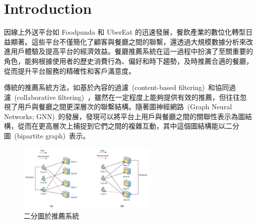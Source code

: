 \section{Introduction}
\label{sec:intro}

因線上外送平台如 Foodpanda 和 UberEat 的迅速發展，餐飲產業的數位化轉型日益顯著。這些平台不僅簡化了顧客與餐廳之間的聯繫，還透過大規模數據分析來改進用戶體驗及提高平台的經濟效益。餐廳推薦系統在這一過程中扮演了至關重要的角色，能夠根據使用者的歷史消費行為、偏好和時下趨勢，及時推薦合適的餐廳，從而提升平台服務的精確性和客戶滿意度。

傳統的推薦系統方法，如基於內容的過濾~(content-based filtering)~和協同過濾~(collaborative filtering)~，雖然在一定程度上能夠提供有效的推薦，但往往忽視了用戶與餐廳之間更深層次的聯繫結構。隨著圖神經網路~(Graph Neural Networks; GNN)~的發展，發現可以將平台上用戶與餐廳之間的關聯性表示為圖結構，從而在更高層次上捕捉到它們之間的複雜互動，其中這個圖結構能以二分圖~(bipartite graph)~表示。
\begin{figure}[tbh]
    \centering
    \includegraphics[width=0.6\textwidth]{img/bipartite_graph.png}
    \caption{二分圖於推薦系統~\cite{bipratite_fig}}
    \label{fig-bipartite}
\end{figure}

